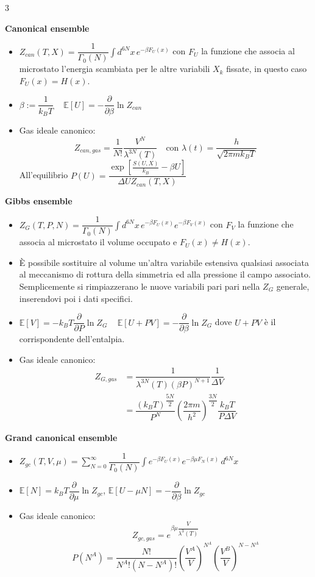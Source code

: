 \documentclass[10pt,a4paper]{report}
\begin{document}
\begin{multicols*}{3}
\begin{center}
\textbf{Canonical ensemble}
\begin{itemize}[label=$\cdot$]
\item $Z_{can}(T,X)=\dfrac{1}{\Gamma_0(N)}\int d^{6N}x\, e^{-\beta F_U(x)}$ con $F_U$ la funzione che associa al microstato l'energia scambiata per le altre variabili $X_k$ fissate, in questo caso $F_U(x)=H(x)$.
\item $\beta:=\dfrac{1}{k_B T}$ ~ $\mathbb{E}[U]=-\dfrac{\partial}{\partial \beta}\ln Z_{can}$
\item Gas ideale canonico:
\[
Z_{can,gas}=\dfrac{1}{N!}\dfrac{V^N}{\lambda^{3N}(T)}
\quad \text{con }\lambda(t)=\dfrac{h}{\sqrt{2\pi mk_B T} }
\]
All'equilibrio $P(U)=\dfrac{ \exp{\left[ \frac{S(U,X)}{k_B}-\beta U \right]  } }{ \Delta U Z_{can}(T,X) }$
\end{itemize}

\textbf{Gibbs ensemble}
\begin{itemize}[label=$\cdot$]
\item $Z_{G}(T,P,N)=\dfrac{1}{\Gamma_0(N)}\int d^{6N}x\, e^{-\beta F_U(x)}e^{-\beta F_V(x)}$ con $F_V$ la funzione che associa al microstato il volume occupato e $F_U(x)\neq H(x)$.
\item È possibile sostituire al volume un'altra variabile estensiva qualsiasi associata al meccanismo di rottura della simmetria ed alla pressione il campo associato. Semplicemente si rimpiazzerano le nuove variabili pari pari nella $Z_G$ generale, inserendovi poi i dati specifici.
\item $\mathbb{E}[V]=-k_B T\dfrac{\partial}{\partial P}\ln Z_{G}$ ~ $\mathbb{E}[U+PV]=-\dfrac{\partial}{\partial \beta}\ln Z_{G}$ dove $U+PV$ è il corrispondente dell'entalpia.
\item Gas ideale canonico:
\begin{align*}
Z_{G,gas}&= \dfrac{1}{\lambda^{3N}(T)(\beta P)^{N+1}}\dfrac{1}{\Delta V} \\&=\dfrac{(k_BT)^{\dfrac{5N}{2}}}{P^N}\left(\dfrac{2\pi m}{h^2} \right)^{\dfrac{3N}{2}}\dfrac{k_B T}{P\Delta V}
\end{align*}
\end{itemize}

\textbf{Grand canonical ensemble}
\begin{itemize}[label=$\cdot$]
\item $Z_{gc}(T,V,\mu)=\sum_{N=0}^\infty \dfrac{1}{\Gamma_0(N)} \int e^{-\beta F_U(x)}e^{-\beta \mu F_N(x)}\,d^{6N}x$
\item $\mathbb{E}[N]=k_B T\dfrac{\partial}{\partial \mu}\ln Z_{gc}$, $\mathbb{E}[U-\mu N]=-\dfrac{\partial}{\partial\beta}\ln Z_{gc}$ 
\item Gas ideale canonico:
\[
Z_{gc,gas}= e^{\beta\mu\dfrac{V}{\lambda^3(T)}}
\]
\[
P(N^A)=\dfrac{N!}{N^A!(N-N^A)!}\left(\dfrac{V^A}{V}\right)^{N^A}\left(\dfrac{V^B}{V}\right)^{N-N^A}
\]
\end{itemize}

\end{center}
\end{multicols*}
\end{document}
